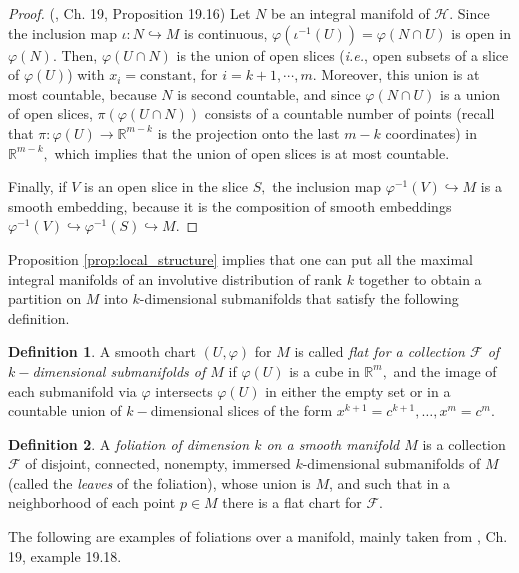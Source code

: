 \documentclass[12pt, letterpaper, reqno]{amsart}
\theoremstyle{definition}
\newtheorem{df}{Definition}
\theoremstyle{plain}
\theoremstyle{remark}
\begin{document}
\begin{proof}(\cite{lee2003introduction}, Ch. 19, Proposition 19.16)
	Let $ N $ be an integral manifold of $ \mathcal{H}. $ Since the inclusion map $ \iota: N \hookrightarrow M $ is continuous, $ \varphi( \iota^{-1}(U))=\varphi(N\cap U) $  is open in $ \varphi(N) $. Then, $ \varphi(U\cap N) $ is the union of open slices (\textit{i.e.}, open subsets of a slice of $ \varphi(U)$) with $ x_i=\text{constant} $, for $ i=k+1,\cdots,m.$ Moreover, this union is at most countable, because $ N $ is second countable, and since $ \varphi(N\cap U) $ is a union of open slices, $ \pi(\varphi(U\cap N)) $ consists of a countable number of points (recall that $ \pi: \varphi(U) \rightarrow \mathbb{R}^{m-k} $ is the projection onto the last $ m-k $ coordinates) in $ \mathbb{R}^{m-k}, $ which implies that the union of open slices is at most countable.  

	Finally, if $ V $ is an open slice in the slice $ S, $ the inclusion map $ \varphi^{-1}(V) \hookrightarrow M $ is a smooth embedding, because it is the composition of smooth embeddings $ \varphi^{-1}(V)\hookrightarrow \varphi^{-1}(S) \hookrightarrow M.$ 
\end{proof}

Proposition \ref{prop:local_structure} implies that one can put all the maximal integral manifolds of an involutive distribution of rank $ k $  together to obtain a partition on $ M $ into $ k $-dimensional submanifolds that satisfy the following definition.
\begin{df}
	A smooth chart $ (U,\varphi) $ for $ M $ is called \textit{flat for a collection $ \mathcal{F} $ of $ k- $dimensional submanifolds of $ M $} if $ \varphi(U) $ is a cube in $ \mathbb{R}^m, $ and the image of each submanifold via $ \varphi $ intersects $ \varphi(U) $ in either the empty set or in a countable union of $ k- $dimensional slices of the form $ x^{k+1}=c^{k+1},\dots,x^m=c^m. $   
\end{df}

\begin{df}
	A \textit{foliation of dimension $ k $ on a smooth manifold $ M $} is a collection $ \mathcal{F} $ of disjoint, connected, nonempty, immersed $ k $-dimensional submanifolds of $ M $ (called the \textit{leaves} of the foliation), whose union is $ M $, and such that in a neighborhood of each point $ p\in M $ there is a flat chart for $ \mathcal{F}. $  
\end{df}

The following are examples of foliations over a manifold, mainly taken from \cite{lee2003introduction}, Ch. 19, example 19.18.
\end{document}
